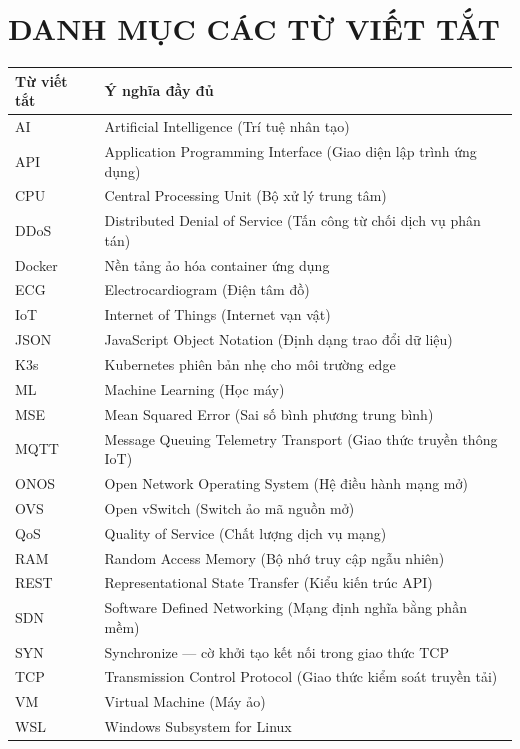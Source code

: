 \chapter*{DANH MỤC CÁC TỪ VIẾT TẮT}

\begin{longtable}{p{} p{}}
\toprule
\textbf{Từ viết tắt} & \textbf{Ý nghĩa đầy đủ} \\
\midrule
\endhead
AI      & Artificial Intelligence (Trí tuệ nhân tạo) \\[2pt]
API     & Application Programming Interface (Giao diện lập trình ứng dụng) \\[2pt]
CPU     & Central Processing Unit (Bộ xử lý trung tâm) \\[2pt]
DDoS    & Distributed Denial of Service (Tấn công từ chối dịch vụ phân tán) \\[2pt]
Docker  & Nền tảng ảo hóa container ứng dụng \\[2pt]
ECG     & Electrocardiogram (Điện tâm đồ) \\[2pt]
IoT     & Internet of Things (Internet vạn vật) \\[2pt]
JSON    & JavaScript Object Notation (Định dạng trao đổi dữ liệu) \\[2pt]
K3s     & Kubernetes phiên bản nhẹ cho môi trường edge \\[2pt]
ML      & Machine Learning (Học máy) \\[2pt]
MSE     & Mean Squared Error (Sai số bình phương trung bình) \\[2pt]
MQTT    & Message Queuing Telemetry Transport (Giao thức truyền thông IoT) \\[2pt]
ONOS    & Open Network Operating System (Hệ điều hành mạng mở) \\[2pt]
OVS     & Open vSwitch (Switch ảo mã nguồn mở) \\[2pt]
QoS     & Quality of Service (Chất lượng dịch vụ mạng) \\[2pt]
RAM     & Random Access Memory (Bộ nhớ truy cập ngẫu nhiên) \\[2pt]
REST    & Representational State Transfer (Kiểu kiến trúc API) \\[2pt]
SDN     & Software Defined Networking (Mạng định nghĩa bằng phần mềm) \\[2pt]
SYN     & Synchronize — cờ khởi tạo kết nối trong giao thức TCP \\[2pt]
TCP     & Transmission Control Protocol (Giao thức kiểm soát truyền tải) \\[2pt]
VM      & Virtual Machine (Máy ảo) \\[2pt]
WSL     & Windows Subsystem for Linux \\[2pt]
\bottomrule
\end{longtable}
\newpage
